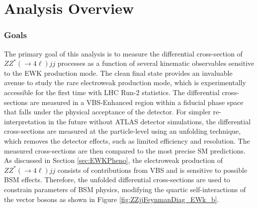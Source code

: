 \part {\LARGE{Analysis Overview}}
\label{sec:AnalysisOverview}

\section{Goals}
\label{sec:Analysis_Goals}

The primary goal of this analysis is to measure the differential cross-section of $ZZ^*(\rightarrow 4\ell) jj$ processes as a function of several kinematic observables sensitive to the EWK production mode. The clean final state provides an invaluable avenue to study the rare electroweak production mode, which is experimentally accessible for the first time with LHC Run-2 statistics. The differential cross-sections are measured in a VBS-Enhanced region within a fiducial phase space that falls under the physical acceptance of the detector. For simpler re-interpretation in the future without ATLAS detector simulations, the differential cross-sections are measured at the particle-level using an unfolding technique, which removes the detector effects, such as limited efficiency and resolution. The measured cross-sections are then compared to the most precise SM predictions. As discussed in Section \ref{sec:EWKPheno}, the electroweak production of $ZZ^*(\rightarrow 4\ell) jj$ consists of contributions from VBS and is sensitive to possible BSM effects. Therefore, the unfolded differential cross-sections are used to constrain parameters of BSM physics, modifying the quartic self-interactions of the vector bosons as shown in Figure \ref{fig:ZZjjFeynmanDiag_EWk_b}.